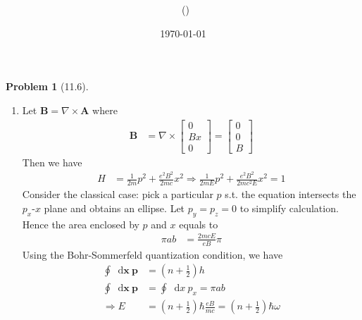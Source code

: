 \documentclass[twoside,11pt]{article}
\title{{\lms \Code \ \Ass}}
\author{\lms \name \ (\href{mailto:\mail}{\mail})}
\date{\sffamily \today}
\makeatletter
\renewcommand*\d{\mathop{}\!\mathrm{d}}
\theoremstyle{definition}
\newtheorem{problem}{Problem}
\theoremstyle{remark}
\newtheorem*{remark}{Remark}
\renewcommand{\maketitle}{\bgroup\setlength{\parindent}{0pt}
\begin{flushleft}
  \textbf{\Large\@title}

  \@author
\end{flushleft}\egroup
}
\makeatother
\begin{document}
\maketitle
\thispagestyle{title}



\begin{problem}[11.6]\
\begin{enumerate}[label=(\alph*)]
\item 
Let $\mathbf{B} = \nabla\times\mathbf{A}$ where
\begin{align*}
    \mathbf{B} &= \nabla\times\begin{bmatrix}
        0 \\ Bx \\ 0
    \end{bmatrix} = \begin{bmatrix}
        0 \\ 0 \\ B
    \end{bmatrix}
\end{align*}
Then we have
\begin{align*}
    H &= \frac{1}{2m}p^2 + \frac{e^2B^2}{2mc}x^2\Rightarrow
    \frac{1}{2mE}p^2 + \frac{e^2B^2}{2mc^2E}x^2 = 1
\end{align*}
Consider the classical case: pick a particular $p$ s.t.
the equation intersects the $p_x$-$x$ plane and obtains an ellipse.
Let $p_y=p_z=0$ to simplify calculation.
Hence the area enclosed by $p$ and $x$ equals to 
\begin{align*}
    \pi a b &= \frac{2mcE}{eB}\pi 
\end{align*}
Using the Bohr-Sommerfeld quantization condition, we have
\begin{align*}
    \oint\d\mathbf{x}\ \mathbf{p} &= \left(n+\frac{1}{2}\right)h\\
    \oint\d\mathbf{x}\ \mathbf{p} &= \oint\d x\ p_x = \pi ab\\
    \Rightarrow E &= \left(n+\frac{1}{2}\right)\hbar\frac{eB}{mc}
    = \left(n+\frac{1}{2}\right)\hbar\omega
\end{align*}


\end{enumerate}
\end{problem}
\end{document}
